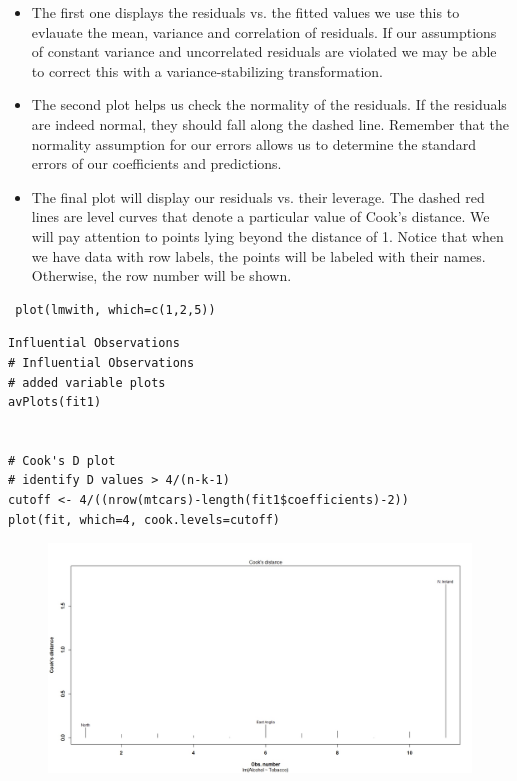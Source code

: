 \documentclass[residuals.tex]{subfiles}
\begin{document}
\begin{itemize}
\item The first one displays the residuals vs. the fitted values
 we use this to evlauate the mean, variance and correlation of residuals.
 If our assumptions of constant variance and uncorrelated residuals are
 violated we may be able to correct this with a variance-stabilizing
 transformation.
 
\item The second plot helps us check the normality of the residuals. If the
 residuals are indeed normal, they should fall along the dashed line.
 Remember that the normality assumption for our errors allows us to determine
 the standard errors of our coefficients and predictions.
 
\item The final plot will display our residuals vs. their leverage. The dashed red
 lines are level curves that denote a particular value of Cook's distance.
 We will pay attention to points lying beyond the distance of 1. Notice that
 when we have data with row labels, the points will be labeled with their
 names. Otherwise, the row number will be shown.
\end{itemize}
 \begin{framed}
 	\begin{verbatim}
 plot(lmwith, which=c(1,2,5))
 \end{verbatim}
\end{framed}

\begin{framed}
	\begin{verbatim}
Influential Observations
# Influential Observations
# added variable plots 
avPlots(fit1)


# Cook's D plot
# identify D values > 4/(n-k-1) 
cutoff <- 4/((nrow(mtcars)-length(fit1$coefficients)-2)) 
plot(fit, which=4, cook.levels=cutoff)
 \end{verbatim}
\end{framed}
\begin{figure}
\centering
\includegraphics[width=0.7\linewidth]{alcotob6}
\caption{}
\label{fig:alcotob6}
\end{figure}
\end{document}
